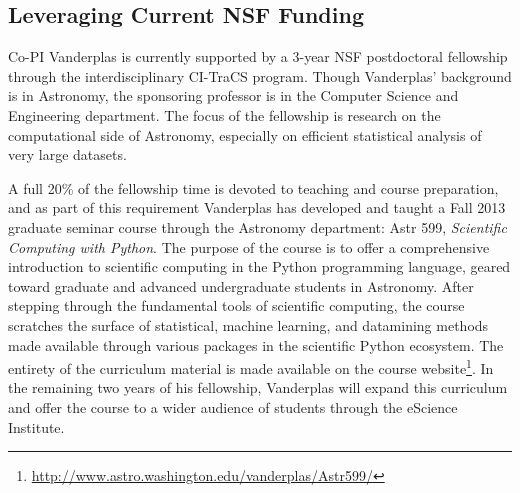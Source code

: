 \subsection{Leveraging Current NSF Funding}
\label{sec:Jake}

Co-PI Vanderplas is currently supported by a 3-year NSF postdoctoral
fellowship through the interdisciplinary CI-TraCS program.  Though
Vanderplas' background is in Astronomy, the sponsoring professor is in
the Computer Science and Engineering department.  The focus of the
fellowship is research on the computational side of Astronomy, especially
on efficient statistical analysis of very large datasets.

A full 20\% of the fellowship time is devoted to teaching and course
preparation, and as part of this requirement Vanderplas has developed
and taught a Fall 2013
graduate seminar course through the Astronomy department:
Astr 599, {\it Scientific Computing with Python}.  The purpose of the
course is to offer a comprehensive introduction to scientific computing
in the Python programming language, geared toward graduate 
and advanced undergraduate students in Astronomy.
After stepping through the fundamental tools of scientific computing,
the course scratches the surface of statistical, machine learning, and
datamining methods made available through various packages in the scientific
Python ecosystem. The entirety of
the curriculum material is made available on the course website\footnote{
\url{http://www.astro.washington.edu/vanderplas/Astr599/}}.
In the remaining two years of his fellowship, Vanderplas will expand this
curriculum and offer the course to a wider audience of students through
the eScience Institute.

